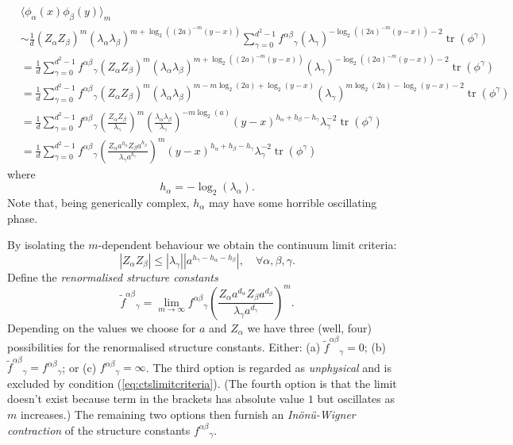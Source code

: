 \documentclass[11pt,oneside]{amsart}
\DeclareMathOperator{\tr}{tr}
\theoremstyle{plain}%
\theoremstyle{definition}
\theoremstyle{remark}
\begin{document}
\begin{align}
	&\langle \phi_\alpha (x)\phi_\beta (y)\rangle_m\\
	&\sim \frac1d (Z_\alpha Z_\beta)^m(\lambda_\alpha\lambda_\beta)^{m+ \log_2 \left( (2a)^{-m}(y-x)\right) } \sum_{\gamma = 0}^{d^2-1} {f^{\alpha\beta}}_\gamma (\lambda_{\gamma})^{-\log_2 \left( (2a)^{-m}(y-x)\right)-2} \tr(\phi^\gamma) \\
	&= \frac1d \sum_{\gamma = 0}^{d^2-1} {f^{\alpha\beta}}_\gamma (Z_\alpha Z_\beta)^m(\lambda_\alpha\lambda_\beta)^{m+ \log_2 \left( (2a)^{-m}(y-x)\right) }(\lambda_{\gamma})^{-\log_2 \left( (2a)^{-m}(y-x)\right)-2} \tr(\phi^\gamma) \\
	&= \frac1d \sum_{\gamma = 0}^{d^2-1} {f^{\alpha\beta}}_\gamma (Z_\alpha Z_\beta)^m(\lambda_\alpha\lambda_\beta)^{m-m\log_2 (2a) + \log_2(y-x)}(\lambda_{\gamma})^{m\log_2 (2a) - \log_2(y-x)-2} \tr(\phi^\gamma) \\
	&= \frac1d\sum_{\gamma = 0}^{d^2-1} {f^{\alpha\beta}}_\gamma \left(\frac{Z_\alpha Z_\beta}{\lambda_\gamma}\right)^m\left(\frac{\lambda_\alpha\lambda_\beta}{\lambda_\gamma}\right)^{-m\log_2 (a)}(y-x)^{h_\alpha+h_\beta - h_\gamma} \lambda_\gamma^{-2}\tr(\phi^\gamma) \\
	&= \frac1d\sum_{\gamma = 0}^{d^2-1} {f^{\alpha\beta}}_\gamma \left(\frac{Z_\alpha a^{h_\alpha} Z_\beta a^{h_\beta}}{\lambda_\gamma a^{h_\gamma}}\right)^m(y-x)^{h_\alpha + h_\beta - h_\gamma} \lambda_\gamma^{-2}\tr(\phi^\gamma)
\end{align}
where
\begin{equation}
	h_\alpha = -\log_2(\lambda_\alpha).
\end{equation}
Note that, being generically complex, $h_\alpha$ may have some horrible oscillating phase.

By isolating the $m$-dependent behaviour we obtain the continuum limit criteria:
\begin{equation}\label{eq:ctslimitcriteria}
	|Z_\alpha  Z_\beta | \le | \lambda_\gamma ||a^{h_\gamma-h_\alpha-h_\beta}|, \quad \forall \alpha,\beta,\gamma.
\end{equation}
Define the \emph{renormalised structure constants}
\begin{equation}
	{\widetilde{f}^{\alpha\beta}\hspace{0pt}}_\gamma = \lim_{m\rightarrow\infty}{f^{\alpha\beta}}_\gamma \left(\frac{Z_\alpha a^{d_\alpha} Z_\beta a^{d_\beta}}{\lambda_\gamma a^{d_\gamma}}\right)^m.
\end{equation}
Depending on the values we choose for $a$ and $Z_\alpha$ we have three (well, four) possibilities for the renormalised structure constants. Either: (a) ${\widetilde{f}^{\alpha\beta}\hspace{0pt}}_\gamma =0$; (b) ${\widetilde{f}^{\alpha\beta}\hspace{0pt}}_\gamma = {f^{\alpha\beta}}_\gamma$; or (c) ${f^{\alpha\beta}}_\gamma = \infty$. The third option is regarded as \emph{unphysical} and is excluded by condition (\ref{eq:ctslimitcriteria}). (The fourth option is that the limit doesn't exist because term in the brackets has absolute value $1$ but oscillates as $m$ increases.) The remaining two options then furnish an \emph{In\"{o}n\"{u}-Wigner contraction} of the structure constants ${f^{\alpha\beta}}_\gamma$.
\end{document}
